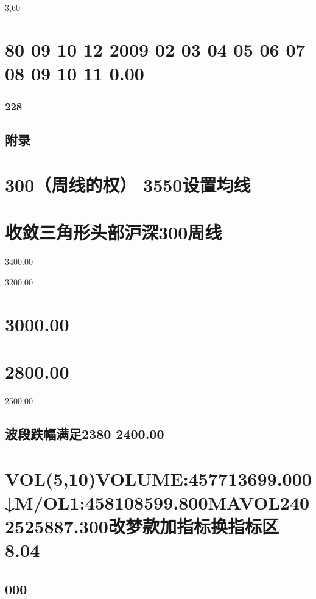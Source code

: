 \documentclass{article}
\begin{document}
3,60

\section{80 09 10 12 2009 02 03 04 05 06 07 08 09 10 11 0.00}

\subsubsection{228}

\clearpage

\subsection{附录}

\section{300（周线的权） 3550设置均线}

\section{收敛三角形头部沪深300周线}

3400.00

3200.00

\section{3000.00}

\section{2800.00}

2500.00

\subsection{波段跌幅满足2380 2400.00}

\section{VOL(5,10)VOLUME:457713699.000↓M/OL1:458108599.800MAVOL2402525887.300改梦款加指标换指标区8.04}

\subsection{000}
\end{document}
